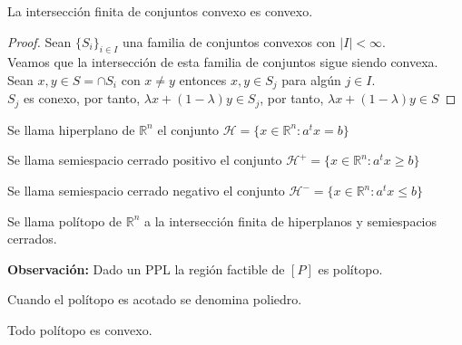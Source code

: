 \documentclass[11pt,fleqn]{book} %
\begin{document}
\begin{proposition}
  La intersección finita de conjuntos convexo es convexo.
\end{proposition}

\begin{proof}
  Sean $\{S_i\}_{i \in I}$ una familia de conjuntos convexos con $|I|<\infty$. \\
  Veamos que la intersección de esta familia de conjuntos sigue siendo convexa. \\
  Sean $x, y \in S=\cap S_i$ con $x \neq y$ entonces $x, y \in S_j$ para algún $j\in I$. \\
  $S_j$ es conexo, por tanto, $\lambda x+(1-\lambda)y \in S_j$, por tanto, $\lambda x+(1-\lambda)y \in S$
\end{proof}

\begin{definition}
  Se llama hiperplano de $\mathbb{R}^n$ el conjunto $\mathcal{H}=\{x \in \mathbb{R}^n : a^t x = b \}$ 
\end{definition}

\begin{definition}
  Se llama semiespacio cerrado positivo el conjunto $\mathcal{H}^+=\{x \in \mathbb{R}^n : a^t x \geq b \}$
\end{definition}
\begin{definition}
  Se llama semiespacio cerrado negativo el conjunto $\mathcal{H}^-=\{x \in \mathbb{R}^n : a^t x \leq b \}$
\end{definition}

\begin{definition}[Polítopo]
  Se llama polítopo de $\mathbb{R}^n$ a la intersección finita de hiperplanos y semiespacios cerrados.
\end{definition}
\textbf{Observación: } Dado un PPL la región factible de $[P]$ es polítopo.

\begin{definition}[Poliedro]
  Cuando el polítopo es acotado se denomina poliedro.
\end{definition}

\begin{proposition}
  Todo polítopo es convexo.
\end{proposition}
\end{document}
